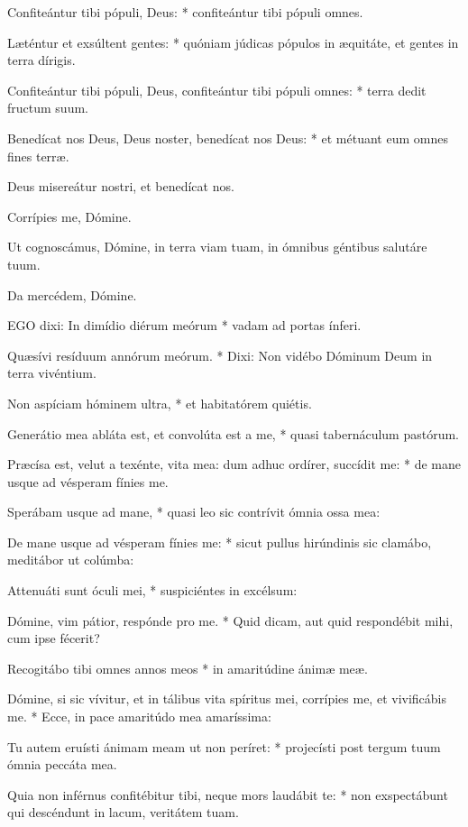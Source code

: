 Confiteántur tibi pópuli, Deus: * confiteántur tibi pópuli omnes.

Læténtur et exsúltent gentes: * quóniam júdicas pópulos in æquitáte, et gentes in terra dírigis.

Confiteántur tibi pópuli, Deus, confiteántur tibi pópuli omnes: * terra dedit fructum suum.

Benedícat nos Deus, Deus noster, benedícat nos Deus: * et métuant eum omnes fines terræ.

 Deus misereátur nostri, et benedícat nos.

 Corrípies me, Dómine.

  Ut cognoscámus, Dómine, in terra viam tuam, in ómnibus géntibus salutáre tuum.

 Da mercédem, Dómine.


\lettrine[lines=2]{E}{GO} dixi: In dimídio diérum meórum * vadam ad portas ínferi.

Quæsívi resíduum annórum meórum. * Dixi: Non vidébo Dóminum Deum in terra vivéntium.

Non aspíciam hóminem ultra, * et habitatórem quiétis.

Generátio mea abláta est, et convolúta est a me, * quasi tabernáculum pastórum.

Præcísa est, velut a texénte, vita mea: dum adhuc ordírer, succídit me: * de mane usque ad vésperam fínies me.

Sperábam usque ad mane, * quasi leo sic contrívit ómnia ossa mea:

De mane usque ad vésperam fínies me: * sicut pullus hirúndinis sic clamábo, meditábor ut colúmba:

Attenuáti sunt óculi mei, * suspiciéntes in excélsum:

Dómine, vim pátior, respónde pro me. * Quid dicam, aut quid respondébit mihi, cum ipse fécerit?

Recogitábo tibi omnes annos meos * in amaritúdine ánimæ meæ.

Dómine, si sic vívitur, et in tálibus vita spíritus mei, corrípies me, et vivificábis me. * Ecce, in pace amaritúdo mea amaríssima:

Tu autem eruísti ánimam meam ut non períret: * projecísti post tergum tuum ómnia peccáta mea.

Quia non inférnus confitébitur tibi, neque mors laudábit te: * non exspectábunt qui descéndunt in lacum, veritátem tuam.

